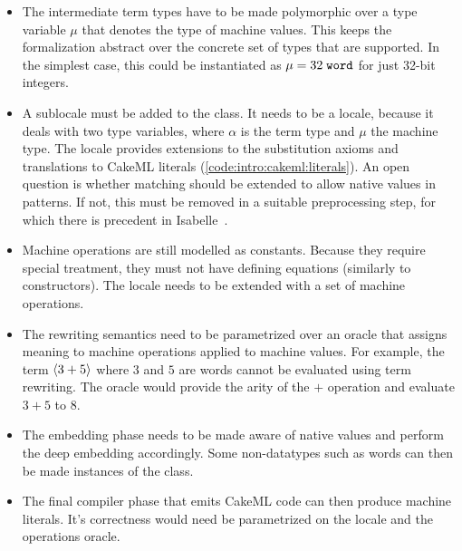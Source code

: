 \begin{itemize}
  \item
    The intermediate term types have to be made polymorphic over a type variable $\mu$ that denotes the type of machine values.
    This keeps the formalization abstract over the concrete set of types that are supported.
    In the simplest case, this could be instantiated as $\mu = 32\;\texttt{\textup{word}}$ for just 32-bit integers.
  \item
    A sublocale  must be added to the  class.
    It needs to be a locale, because it deals with two type variables, where $\alpha$ is the term type and $\mu$ the machine type.
    The locale provides extensions to the substitution axioms and translations to CakeML literals (\cref{code:intro:cakeml:literals}).
    An open question is whether matching should be extended to allow native values in patterns.
    If not, this must be removed in a suitable preprocessing step, for which there is precedent in Isabelle~\cite[§7.3]{haftmann2018code}.
  \item
    Machine operations are still modelled as constants.
    Because they require special treatment, they must not have defining equations (similarly to constructors).
    The  locale needs to be extended with a set of machine operations.
  \item
    The rewriting semantics need to be parametrized over an oracle that assigns meaning to machine operations applied to machine values.
    For example, the term $\left\langle3 + 5\right\rangle$ where $3$ and $5$ are words cannot be evaluated using term rewriting.
    The oracle would provide the arity of the $+$ operation and evaluate $3 + 5$ to $8$.
  \item
    The embedding phase needs to be made aware of native values and perform the deep embedding accordingly.
    Some non-datatypes such as words can then be made instances of the  class.
  \item
    The final compiler phase that emits CakeML code can then produce machine literals.
    It's correctness would need be parametrized on the  locale and the operations oracle.
\end{itemize}
